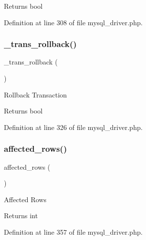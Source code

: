 \begin{DoxyReturn}{Returns}
bool 
\end{DoxyReturn}


Definition at line 308 of file mysql\+\_\+driver.\+php.

\mbox{\label{class_c_i___d_b__mysql__driver_ad49a116b0776c26b53114c9093fd102a}} 
\subsubsection{\texorpdfstring{\_trans\_rollback()}{\_trans\_rollback()}}
{\footnotesize\ttfamily \+\_\+trans\+\_\+rollback (\begin{DoxyParamCaption}{ }\end{DoxyParamCaption})\hspace{0.3cm}{\ttfamily [protected]}}

Rollback Transaction

\begin{DoxyReturn}{Returns}
bool 
\end{DoxyReturn}


Definition at line 326 of file mysql\+\_\+driver.\+php.

\mbox{\label{class_c_i___d_b__mysql__driver_a77248aaad33eb132c04cc4aa3f4bc8cb}} 
\subsubsection{\texorpdfstring{affected\_rows()}{affected\_rows()}}
{\footnotesize\ttfamily affected\+\_\+rows (\begin{DoxyParamCaption}{ }\end{DoxyParamCaption})}

Affected Rows

\begin{DoxyReturn}{Returns}
int 
\end{DoxyReturn}


Definition at line 357 of file mysql\+\_\+driver.\+php.

\mbox{\label{class_c_i___d_b__mysql__driver_a52bf595e79e96cc0a7c907a9b45aeb4d}} 
